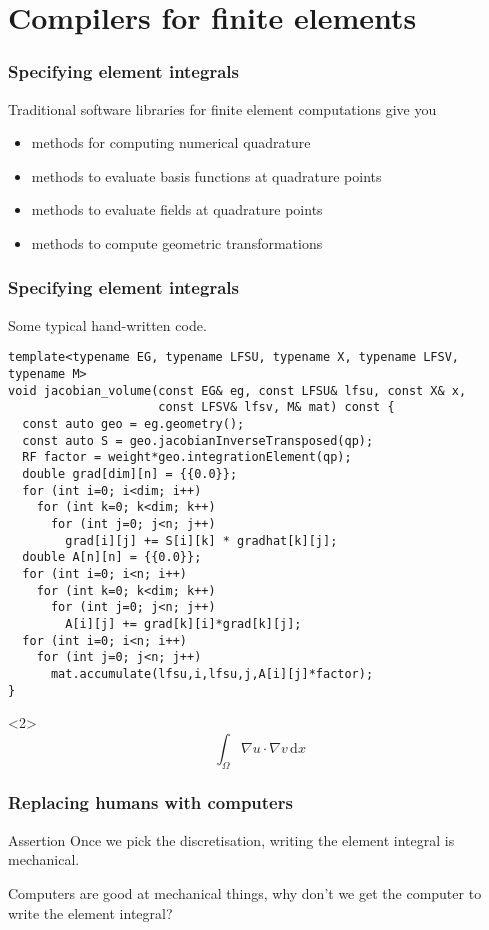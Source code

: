 \documentclass[presentation]{beamer}
\begin{document}
\section{Compilers for finite elements}

\begin{frame}
  \frametitle{Specifying element integrals}

  Traditional software libraries for finite element computations give you
  \begin{itemize}
  \item methods for computing numerical quadrature
  \item methods to evaluate basis functions at quadrature points
  \item methods to evaluate fields at quadrature points
  \item methods to compute geometric transformations
  \end{itemize}
\end{frame}
\begin{frame}[fragile]
  \frametitle{Specifying element integrals}
  Some typical hand-written code.

  \begin{center}
\begin{verbatim}
template<typename EG, typename LFSU, typename X, typename LFSV, typename M>
void jacobian_volume(const EG& eg, const LFSU& lfsu, const X& x,
                     const LFSV& lfsv, M& mat) const {
  const auto geo = eg.geometry();
  const auto S = geo.jacobianInverseTransposed(qp);
  RF factor = weight*geo.integrationElement(qp);
  double grad[dim][n] = {{0.0}};
  for (int i=0; i<dim; i++)
    for (int k=0; k<dim; k++)
      for (int j=0; j<n; j++)
        grad[i][j] += S[i][k] * gradhat[k][j];
  double A[n][n] = {{0.0}};
  for (int i=0; i<n; i++)
    for (int k=0; k<dim; k++)
      for (int j=0; j<n; j++)
        A[i][j] += grad[k][i]*grad[k][j];
  for (int i=0; i<n; i++)
    for (int j=0; j<n; j++)
      mat.accumulate(lfsu,i,lfsu,j,A[i][j]*factor);
}
\end{verbatim}
  \end{center}
  \begin{uncoverenv}<2>
    \begin{equation*}
      \int_\Omega \nabla u \cdot \nabla v\,\text{d}x
    \end{equation*}
  \end{uncoverenv}
\end{frame}

\begin{frame}
  \frametitle{Replacing humans with computers}
  \begin{block}{Assertion}
    Once we pick the discretisation, writing the element integral is mechanical.
  \end{block}
  \begin{corollary}
    Computers are good at mechanical things, why don't we get the
    computer to write the element integral?
  \end{corollary}
\end{frame}
\end{document}
